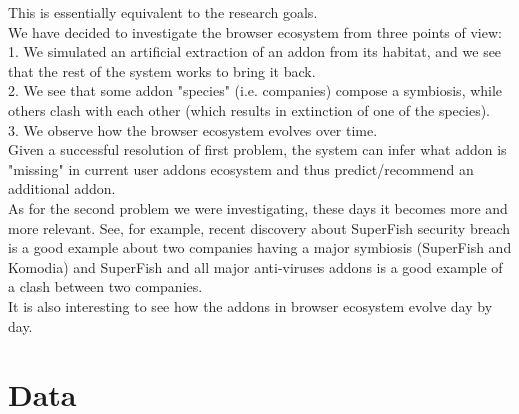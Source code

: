 \documentclass[11pt,oneside]{book}
\begin{document}

This is essentially equivalent to the research goals.\\
We have decided to investigate the browser ecosystem from three points of view:\\
1. We simulated an artificial extraction of an addon from its habitat, and we see that the rest of the system works to bring it back.\\
2. We see that some addon "species" (i.e. companies) compose a symbiosis, while others clash with each other (which results in extinction of one of the species).\\
3. We observe how the browser ecosystem evolves over time.\\
Given a successful resolution of first problem, the system can infer what addon is "missing" in current user addons ecosystem and thus predict/recommend an additional addon.\\
As for the second problem we were investigating, these days it becomes more and more relevant. See, for example, recent discovery about SuperFish security breach is a good example about two companies having a major symbiosis (SuperFish and Komodia) and SuperFish and all major anti-viruses addons is a good example of a clash between two companies.\\
It is also interesting to see how the addons in browser ecosystem evolve day by day.



\chapter{Data}
\label{sec:datasets}
\end{document}
